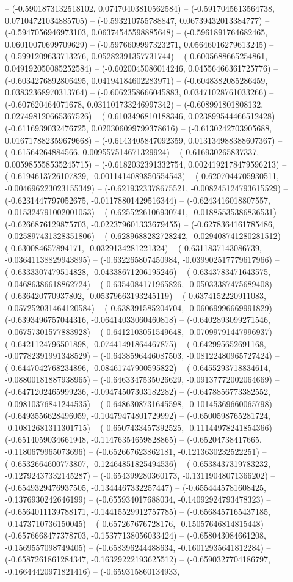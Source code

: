 -- (-0.5901873132518102, 0.07470403810562584) -- (-0.5917045613564738, 0.07104721034885705) -- (-0.593210755788847, 0.06739432013384777) -- (-0.5947056946973103, 0.06374545598885648) -- (-0.5961891764682465, 0.06010070699709629) -- (-0.5976609997323271, 0.05646016279613245) -- (-0.5991209633713276, 0.05282391357731744) -- (-0.6005688665254861, 0.049192050085252584) -- (-0.6020045086014246, 0.04556466361725776) -- (-0.6034276892806495, 0.04194184602283971) -- (-0.6048382085286459, 0.03832368970313764) -- (-0.6062358666045883, 0.03471028761033266) -- (-0.607620464071678, 0.031101733246997342) -- (-0.608991801808132, 0.027498120665367526) -- (-0.6103496810188346, 0.023899544466512428) -- (-0.6116939032476725, 0.020306099799378616) -- (-0.6130242703905688, 0.016717882359679668) -- (-0.6143405847092359, 0.013134988388607367) -- (-0.61564264884566, 0.009557514671329924) -- (-0.616930265837337, 0.005985558535245715) -- (-0.6182032391332754, 0.0024192178479596213) -- (-0.6194613726107829, -0.0011414089850554543) -- (-0.6207044705930511, -0.004696223023155349) -- (-0.6219323378675521, -0.008245124793615529) -- (-0.6231447797052675, -0.01178801429516344) -- (-0.6243416018807557, -0.015324791002001053) -- (-0.6255226106930741, -0.01885535386836531) -- (-0.6266876129875703, -0.022379601333679455) -- (-0.6278364161785486, -0.025897431328351806) -- (-0.6289688282728242, -0.029408741280281512) -- (-0.630084657894171, -0.0329134281221324) -- (-0.6311837143086739, -0.03641138829943895) -- (-0.632265807450984, -0.039902517779617966) -- (-0.6333307479514828, -0.04338671206195246) -- (-0.6343783471643575, -0.04686386618862724) -- (-0.6354084171965826, -0.05033387475689408) -- (-0.636420770937802, -0.05379663193245119) -- (-0.6374152220911083, -0.057252031464120584) -- (-0.638391585204704, -0.06069996669991829) -- (-0.6393496757044316, -0.06414033060460818) -- (-0.6402893099271546, -0.06757301577883928) -- (-0.6412103051549648, -0.07099791447996937) -- (-0.6421124796501898, -0.07441491864467875) -- (-0.642995652691168, -0.07782391991348529) -- (-0.6438596446087503, -0.08122480965727424) -- (-0.6447042768234896, -0.08461747900595822) -- (-0.6455293718834614, -0.08800181887938965) -- (-0.6463347535026629, -0.09137772002064669) -- (-0.6471202465999236, -0.09474507303182282) -- (-0.6478856773382552, -0.09810376841244535) -- (-0.6486308731645598, -0.10145369660065798) -- (-0.6493556628496059, -0.10479474801729992) -- (-0.6500598765281724, -0.10812681311301715) -- (-0.6507433457392525, -0.11144978241854366) -- (-0.6514059034661948, -0.11476354659828865) -- (-0.65204738417665, -0.1180679965073696) -- (-0.652667623862181, -0.1213630232522251) -- (-0.6532664600773807, -0.12464851825494536) -- (-0.6538437319783232, -0.12792437332145287) -- (-0.654399280360173, -0.13119048071366202) -- (-0.6549329476937505, -0.1344467332257447) -- (-0.6554445781608425, -0.1376930242646199) -- (-0.655934017688034, -0.14092924793478323) -- (-0.6564011139788171, -0.14415529912757785) -- (-0.6568457165437185, -0.1473710736150045) -- (-0.657267676728176, -0.15057646814815448) -- (-0.6576668477378703, -0.15377138056033424) -- (-0.658043084661208, -0.1569557098749405) -- (-0.658396244488634, -0.16012935641812284) -- (-0.6587261861284347, -0.16329222193625512) -- (-0.6590327704186797, -0.16644420971821416) -- (-0.659315860134933, 